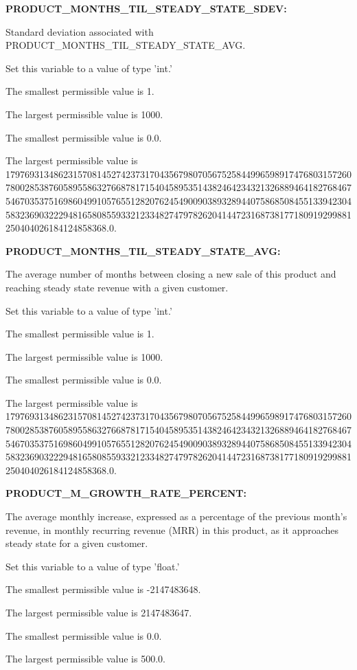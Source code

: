 \textbf{PRODUCT\_MONTHS\_TIL\_STEADY\_STATE\_SDEV:}


Standard deviation associated with PRODUCT\_MONTHS\_TIL\_STEADY\_STATE\_AVG.

Set this variable to a value of type 'int.'

The smallest permissible value is 1.

The largest permissible value is 1000.

The smallest permissible value is 0.0.

The largest permissible value is 179769313486231570814527423731704356798070567525844996598917476803157260780028538760589558632766878171540458953514382464234321326889464182768467546703537516986049910576551282076245490090389328944075868508455133942304583236903222948165808559332123348274797826204144723168738177180919299881250404026184124858368.0.


\textbf{PRODUCT\_MONTHS\_TIL\_STEADY\_STATE\_AVG:}


The average number of months between closing a new sale of this product and reaching steady state revenue with a given customer.

Set this variable to a value of type 'int.'

The smallest permissible value is 1.

The largest permissible value is 1000.

The smallest permissible value is 0.0.

The largest permissible value is 179769313486231570814527423731704356798070567525844996598917476803157260780028538760589558632766878171540458953514382464234321326889464182768467546703537516986049910576551282076245490090389328944075868508455133942304583236903222948165808559332123348274797826204144723168738177180919299881250404026184124858368.0.


\textbf{PRODUCT\_M\_GROWTH\_RATE\_PERCENT:}


The average monthly increase, expressed as a percentage of the previous month's revenue, in monthly recurring revenue (MRR) in this product, as it approaches steady state for a given customer.

Set this variable to a value of type 'float.'

The smallest permissible value is -2147483648.

The largest permissible value is 2147483647.

The smallest permissible value is 0.0.

The largest permissible value is 500.0.


